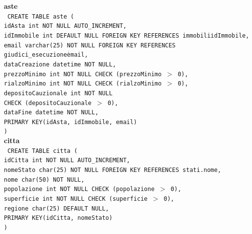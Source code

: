 \documentclass[a4paper,12pt]{report}
\begin{document}
                \noindent
                {\large \textbf{aste}} \\
                \texttt{
                    CREATE TABLE aste ( \\
                    \null\quad\quad idAsta          int         NOT NULL AUTO\_INCREMENT, \\
                    \null\quad\quad idImmobile int DEFAULT NULL FOREIGN KEY REFERENCES immobili\.idImmobile, \\
                    \null\quad\quad email varchar(25) NOT NULL FOREIGN KEY REFERENCES giudici\_esecuzione\.email, \\
                    \null\quad\quad dataCreazione       datetime    NOT NULL, \\
                    \null\quad\quad prezzoMinimo        int         NOT NULL CHECK (prezzoMinimo $>$ 0), \\
                    \null\quad\quad rialzoMinimo        int         NOT NULL CHECK (rialzoMinimo $>$ 0), \\
                    \null\quad\quad depositoCauzionale  int         NOT NULL \\
                            \null\qquad\qquad CHECK (depositoCauzionale $>$ 0), \\
                    \null\quad\quad dataFine            datetime    NOT NULL, \\
                    \null\quad\quad PRIMARY KEY(idAsta, idImmobile, email) \\
                    )
                } \\

                \newpage
                \noindent
                {\large \textbf{citta}} \\
                \texttt{
                    CREATE TABLE citta ( \\
                    \null\quad\quad idCitta         int         NOT NULL AUTO\_INCREMENT, \\
                    \null\quad\quad nomeStato char(25) NOT NULL FOREIGN KEY REFERENCES stati.nome, \\
                    \null\quad\quad nome            char(50)    NOT NULL, \\
                    \null\quad\quad popolazione     int         NOT NULL CHECK (popolazione $>$ 0), \\
                    \null\quad\quad superficie      int         NOT NULL CHECK (superficie $>$ 0), \\
                    \null\quad\quad regione         char(25) DEFAULT NULL, \\
                    \null\quad\quad PRIMARY KEY(idCitta, nomeStato) \\
                    )
                } \\
\end{document}
